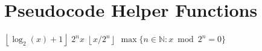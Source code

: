 \section{Pseudocode Helper Functions}

\begin{algorithmic}
    \State \Return $\left\lfloor\log_{2}(x) + 1\right\rfloor$
  \EndFunction
  \Statex
    \State \Return $2^n x$
  \EndFunction
  \Statex
    \State \Return $\left\lfloor x/2^n \right\rfloor$
  \EndFunction
  \Statex
    \State \Return {}
  \EndFunction
  \Statex
    \State \Return $\max \{ n \in \mathbb{N} : x \bmod 2^n = 0 \}$
  \EndFunction
\end{algorithmic}
